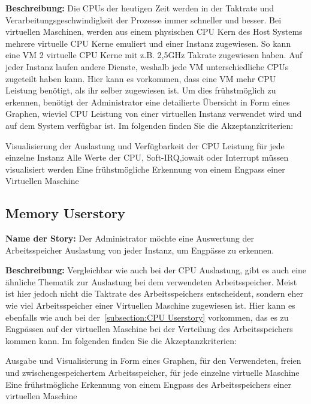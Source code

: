 \textbf{Beschreibung:} Die CPUs der heutigen Zeit werden in der Taktrate und
Verarbeitungsgeschwindigkeit der Prozesse immer schneller und besser. Bei
virtuellen Maschinen, werden aus einem physischen CPU Kern des Host Systems
mehrere virtuelle CPU Kerne emuliert und einer Instanz zugewiesen. So kann eine
VM 2 virtuelle CPU Kerne mit z.B. 2,5GHz Takrate zugewiesen haben. Auf jeder
Instanz laufen andere Dienste, weshalb jede VM unterschiedliche CPUs zugeteilt
haben kann. Hier kann es vorkommen, dass eine VM mehr CPU Leistung benötigt,
als ihr selber zugewiesen ist. Um dies frühstmöglich zu erkennen, benötigt der
Administrator eine detailierte Übersicht in Form eines Graphen, wieviel CPU
Leistung von einer virtuellen Instanz verwendet wird und auf dem System
verfügbar ist. Im folgenden finden Sie die Akzeptanzkriterien:

\begin{outline}
  \1 Visualisierung der Auslastung und Verfügbarkeit der CPU Leistung für jede
  einzelne Instanz
  \1 Alle Werte der CPU, \gls{Soft-IRQ},\gls{iowait} oder \gls{Interrupt}
  müssen visualisiert werden
  \1 Eine frühstmögliche Erkennung von einem Engpass einer Virtuellen Maschine
\end{outline}
\mr%

\subsection{Memory Userstory}
\textbf{Name der Story:} Der Administrator möchte eine Auswertung der
Arbeitsspeicher Auslastung von jeder Instanz, um Engpässe zu erkennen.

\textbf{Beschreibung:} Vergleichbar wie auch bei der CPU Auslastung, gibt es
auch eine ähnliche Thematik zur Auslastung bei dem verwendeten Arbeitsspeicher.
Meist ist hier jedoch nicht die Taktrate des Arbeitsspeichers entscheident,
sondern eher wie viel Arbeitsspeicher einer Virtuellen Maschine zugewiesen ist.
Hier kann es ebenfalls wie auch bei der~\ref{subsection:CPU Userstory}
vorkommen, das es zu Engpässen auf der virtuellen Maschine bei der Verteilung
des Arbeitsspeichers kommen kann. Im folgenden finden Sie die
Akzeptanzkriterien:

\begin{outline}
  \1 Ausgabe und Visualisierung in Form eines Graphen, für den Verwendeten,
  freien und zwischengespeichertem Arbeitsspeicher, für jede einzelne virtuelle
  Maschine
  \1 Eine frühstmögliche Erkennung von einem Engpass des Arbeitsspeichers einer
  virtuellen Maschine
\end{outline}
\mr%

